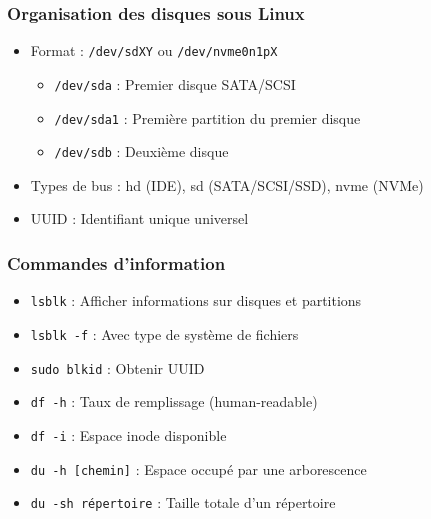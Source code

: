 \documentclass[12pt,a4paper]{article}
\begin{document}
\subsubsection{Organisation des disques sous Linux}
\begin{itemize}
    \item Format : \texttt{/dev/sdXY} ou \texttt{/dev/nvme0n1pX}
    \begin{itemize}
        \item \texttt{/dev/sda} : Premier disque SATA/SCSI
        \item \texttt{/dev/sda1} : Première partition du premier disque
        \item \texttt{/dev/sdb} : Deuxième disque
    \end{itemize}
    \item Types de bus : hd (IDE), sd (SATA/SCSI/SSD), nvme (NVMe)
    \item UUID : Identifiant unique universel
\end{itemize}

\subsubsection{Commandes d'information}
\begin{itemize}
    \item \texttt{lsblk} : Afficher informations sur disques et partitions
    \item \texttt{lsblk -f} : Avec type de système de fichiers
    \item \texttt{sudo blkid} : Obtenir UUID
    \item \texttt{df -h} : Taux de remplissage (human-readable)
    \item \texttt{df -i} : Espace inode disponible
    \item \texttt{du -h [chemin]} : Espace occupé par une arborescence
    \item \texttt{du -sh répertoire} : Taille totale d'un répertoire
\end{itemize}
\end{document}
